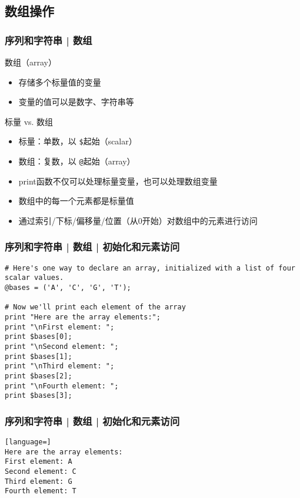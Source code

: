 \subsection{数组操作}
\begin{frame}[fragile]
  \frametitle{序列和字符串 | \alert{数组}}
  \begin{block}{数组（array）}
    \begin{itemize}
      \item 存储多个标量值的变量
      \item 变量的值可以是数字、字符串等
    \end{itemize}
  \end{block}
  \pause
  \begin{block}{标量 vs. 数组}
    \begin{itemize}
      \item 标量：单数，以 \verb|$|起始（scalar）
      \item 数组：复数，以 \verb|@|起始（array）
      \item print函数不仅可以处理标量变量，也可以处理数组变量
      \item 数组中的每一个元素都是标量值
      \item 通过索引/下标/偏移量/位置（从0开始）对数组中的元素进行访问
    \end{itemize}
  \end{block}
\end{frame}

\begin{frame}[fragile]
  \frametitle{序列和字符串 | 数组 | \alert{初始化和元素访问}}
  \vspace{-1.5em}
\begin{lstlisting}
# Here's one way to declare an array, initialized with a list of four scalar values.
@bases = ('A', 'C', 'G', 'T');

# Now we'll print each element of the array
print "Here are the array elements:";
print "\nFirst element: ";
print $bases[0];
print "\nSecond element: ";
print $bases[1];
print "\nThird element: ";
print $bases[2];
print "\nFourth element: ";
print $bases[3];
\end{lstlisting}
\end{frame}

\begin{frame}[fragile]
  \frametitle{序列和字符串 | 数组 | 初始化和元素访问}
  \vspace{-1.5em}
\begin{lstlisting}[language=]
Here are the array elements:
First element: A
Second element: C
Third element: G
Fourth element: T
\end{lstlisting}
\end{frame}

